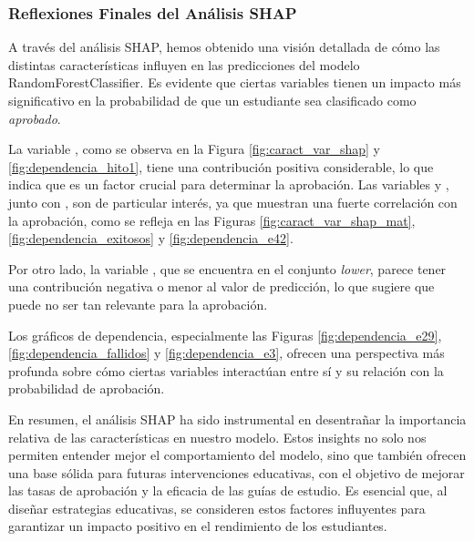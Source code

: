 \subsubsection{Reflexiones Finales del Análisis SHAP}

A través del análisis SHAP, hemos obtenido una visión detallada de cómo las distintas características influyen en las predicciones del modelo RandomForestClassifier. Es evidente que ciertas variables tienen un impacto más significativo en la probabilidad de que un estudiante sea clasificado como \textit{aprobado}.

La variable , como se observa en la Figura \ref{fig:caract_var_shap} y \ref{fig:dependencia_hito1}, tiene una contribución positiva considerable, lo que indica que es un factor crucial para determinar la aprobación. Las variables  y , junto con , son de particular interés, ya que muestran una fuerte correlación con la aprobación, como se refleja en las Figuras \ref{fig:caract_var_shap_mat}, \ref{fig:dependencia_exitosos} y \ref{fig:dependencia_e42}.

Por otro lado, la variable , que se encuentra en el conjunto \textit{lower}, parece tener una contribución negativa o menor al valor de predicción, lo que sugiere que puede no ser tan relevante para la aprobación.

Los gráficos de dependencia, especialmente las Figuras \ref{fig:dependencia_e29}, \ref{fig:dependencia_fallidos} y \ref{fig:dependencia_e3}, ofrecen una perspectiva más profunda sobre cómo ciertas variables interactúan entre sí y su relación con la probabilidad de aprobación.

En resumen, el análisis SHAP ha sido instrumental en desentrañar la importancia relativa de las características en nuestro modelo. Estos insights no solo nos permiten entender mejor el comportamiento del modelo, sino que también ofrecen una base sólida para futuras intervenciones educativas, con el objetivo de mejorar las tasas de aprobación y la eficacia de las guías de estudio. Es esencial que, al diseñar estrategias educativas, se consideren estos factores influyentes para garantizar un impacto positivo en el rendimiento de los estudiantes.